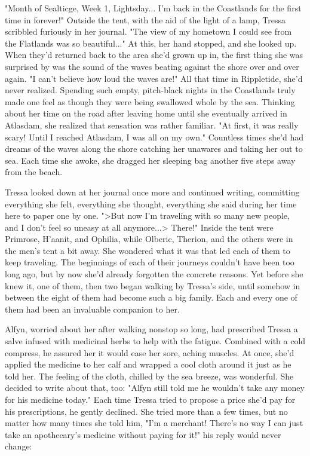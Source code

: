 "Month of Sealticge, Week 1, Lightsday... I'm back in the Coastlands for the first time in forever!" Outside the tent, with the aid of the light of a lamp, Tressa scribbled furiously in her journal. "The view of my hometown I could see from the Flatlands was so beautiful..." At this, her hand stopped, and she looked up. When they'd returned back to the area she'd grown up in, the first thing she was surprised by was the sound of the waves beating against the shore over and over again. "I can't believe how loud the waves are!" All that time in Rippletide, she'd never realized. Spending such empty, pitch-black nights in the Coastlands truly made one feel as though they were being swallowed whole by the sea. Thinking about her time on the road after leaving home until she eventually arrived in Atlasdam, she realized that sensation was rather familiar. "At first, it was really scary! Until I reached Atlasdam, I was all on my own." Countless times she'd had dreams of the waves along the shore catching her unawares and taking her out to sea. Each time she awoke, she dragged her sleeping bag another five steps away from the beach. 

Tressa looked down at her journal once more and continued writing, committing everything she felt, everything she thought, everything she said during her time here to paper one by one. ">But now I'm traveling with so many new people, and I don't feel so uneasy at all anymore...> There!" Inside the tent were Primrose, H'aanit, and Ophilia, while Olberic, Therion, and the others were in the men's tent a bit away. She wondered what it was that led each of them to keep traveling. The beginnings of each of their journeys couldn't have been too long ago, but by now she'd already forgotten the concrete reasons. Yet before she knew it, one of them, then two began walking by Tressa's side, until somehow in between the eight of them had become such a big family. Each and every one of them had been an invaluable companion to her.

Alfyn, worried about her after walking nonstop so long, had prescribed Tressa a salve infused with medicinal herbs to help with the fatigue. Combined with a cold compress, he assured her it would ease her sore, aching muscles. At once, she'd applied the medicine to her calf and wrapped a cool cloth around it just as he told her. The feeling of the cloth, chilled by the sea breeze, was wonderful. She decided to write about that, too: "Alfyn still told me he wouldn't take any money for his medicine today." Each time Tressa tried to propose a price she'd pay for his prescriptions, he gently declined. She tried more than a few times, but no matter how many times she told him, "I'm a merchant! There's no way I can just take an apothecary's medicine without paying for it!" his reply would never change: 

